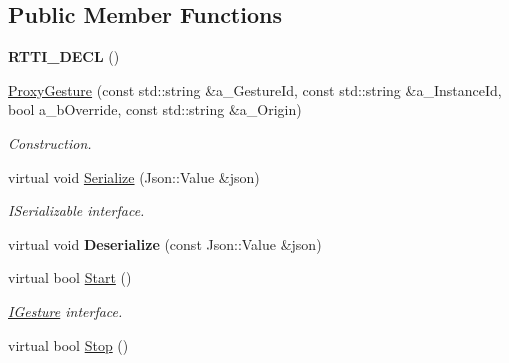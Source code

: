 \subsection*{Public Member Functions}
\begin{DoxyCompactItemize}
\item 
\mbox{\label{class_proxy_gesture_a124484879d950d1871f7140c4fbabe6b}} 
{\bfseries R\+T\+T\+I\+\_\+\+D\+E\+CL} ()
\item 
\mbox{\label{class_proxy_gesture_aac76dd8efbba6a9379300e21eccf3188}} 
\hyperlink{class_proxy_gesture_aac76dd8efbba6a9379300e21eccf3188}{Proxy\+Gesture} (const std\+::string \&a\+\_\+\+Gesture\+Id, const std\+::string \&a\+\_\+\+Instance\+Id, bool a\+\_\+b\+Override, const std\+::string \&a\+\_\+\+Origin)
\begin{DoxyCompactList}\small\item\em Construction. \end{DoxyCompactList}\item 
\mbox{\label{class_proxy_gesture_ad203e53c96ea77d27ea3efb0ecd6e828}} 
virtual void \hyperlink{class_proxy_gesture_ad203e53c96ea77d27ea3efb0ecd6e828}{Serialize} (Json\+::\+Value \&json)
\begin{DoxyCompactList}\small\item\em I\+Serializable interface. \end{DoxyCompactList}\item 
\mbox{\label{class_proxy_gesture_a6756332ee3bd028d9c9ba6cfd3533fb2}} 
virtual void {\bfseries Deserialize} (const Json\+::\+Value \&json)
\item 
\mbox{\label{class_proxy_gesture_a9afef5a1dbccf0bc71ce63b622862346}} 
virtual bool \hyperlink{class_proxy_gesture_a9afef5a1dbccf0bc71ce63b622862346}{Start} ()
\begin{DoxyCompactList}\small\item\em \hyperlink{class_i_gesture}{I\+Gesture} interface. \end{DoxyCompactList}\item 
\mbox{\label{class_proxy_gesture_a7f1b97467409ec54345cf9575ed1b010}} 
virtual bool \hyperlink{class_proxy_gesture_a7f1b97467409ec54345cf9575ed1b010}{Stop} ()

\end{DoxyCompactItemize}
